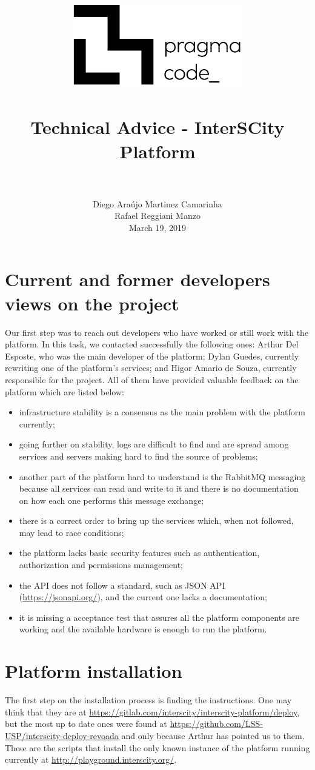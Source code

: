 \documentclass[paper=a4, fontsize=11pt]{scrartcl}
\title{
  \usefont{OT1}{bch}{b}{n}
  \normalfont \normalsize \includegraphics[width=10em]{pc_h_preto} \\ [25pt]
  \horrule{0.5pt} \\[0.4cm]
  \huge Technical Advice - InterSCity Platform \\
  \horrule{2pt} \\[0.5cm]
}
\author{
  \normalfont \normalsize
  Diego Araújo Martinez Camarinha\\[-3pt]    \normalsize
  Rafael Reggiani Manzo\\[-3pt]    \normalsize
  March 19, 2019
}
\date{}
\numberwithin{equation}{section}    %
\numberwithin{figure}{section}      %
\numberwithin{table}{section}        %
\begin{document}
\maketitle

\section{Current and former developers views on the project}
  Our first step was to reach out developers who have worked or still work with the platform. In this task, we contacted successfully the following ones: Arthur Del Esposte, who was the main developer of the platform; Dylan Guedes, currently rewriting one of the platform's services; and Higor Amario de Souza, currently responsible for the project. All of them have provided valuable feedback on the platform which are listed below:

  \begin{itemize}
    \item infrastructure stability is a consensus as the main problem with the platform currently;
    \item going further on stability, logs are difficult to find and are spread among services and servers making hard to find the source of problems;
    \item another part of the platform hard to understand is the RabbitMQ messaging because all services can read and write to it and there is no documentation on how each one performs this message exchange;
    \item there is a correct order to bring up the services which, when not followed, may lead to race conditions;
    \item the platform lacks basic security features such as authentication, authorization and permissions management;
    \item the API does not follow a standard, such as JSON API (\url{https://jsonapi.org/}), and the current one lacks a documentation;
    \item it is missing a acceptance test that assures all the platform components are working and the available hardware is enough to run the platform.
  \end{itemize}

\section{Platform installation}
  The first step on the installation process is finding the instructions. One may think that they are at \url{https://gitlab.com/interscity/interscity-platform/deploy}, but the most up to date ones were found at \url{https://github.com/LSS-USP/interscity-deploy-revoada} and only because Arthur has pointed us to them. These are the scripts that install the only known instance of the platform running currently at \url{http://playground.interscity.org/}.
\end{document}
